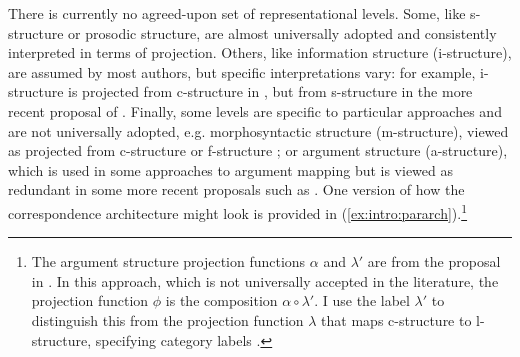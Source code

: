 \documentclass[output=paper]{langscibook}
\begin{document}
 There is currently no agreed-upon set of representational levels. Some, like s-structure or prosodic structure, are almost universally adopted and consistently interpreted in terms of projection. Others, like information structure (i-structure), are assumed by most authors, but specific interpretations vary: for example, i-structure is projected from c-structure in \textcite{King1997,BK00}, but from s-structure in the more recent proposal of \textcite{DN}. Finally, some levels are specific to particular approaches and are not universally adopted, e.g. morphosyntactic structure (m-structure), viewed as projected from c-structure \parencite{butt-etal2004,butt-etal1996-coling} or f-structure \parencite{sadler-nordlinger2004}; or argument structure (a-structure), which is used in some approaches to argument mapping \parencite{butt1997architecture} but is viewed as redundant in some more recent proposals such as \parencite{AsudGior12,asudeh2014meaning,findlay2017mapping}. One version of how the correspondence architecture might look is provided in (\ref{ex:intro:pararch}).\footnote{The argument structure projection functions $\alpha$ and $\lambda'$ are from the proposal in \citet{butt1997architecture}. In this approach, which is not universally accepted in the literature, the projection function $\phi$ is the composition $\alpha \circ \lambda'$. I use the label $\lambda'$ to distinguish this from the projection function $\lambda$ that maps c-structure to l-structure, specifying category labels \citep{low:lov:20}.}
 
 \eas\label{ex:intro:pararch}
 \zs
 
\end{document}
